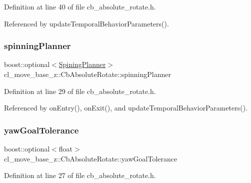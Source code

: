 Definition at line 40 of file cb\+\_\+absolute\+\_\+rotate.\+h.



Referenced by update\+Temporal\+Behavior\+Parameters().

\mbox{\label{classcl__move__base__z_1_1CbAbsoluteRotate_a17d836524599af072cf2e3488e491a91}} 
\subsubsection{\texorpdfstring{spinning\+Planner}{spinningPlanner}}
{\footnotesize\ttfamily boost\+::optional$<$\hyperlink{namespacecl__move__base__z_aab2ad3041275145f0065fb60b3299345}{Spining\+Planner}$>$ cl\+\_\+move\+\_\+base\+\_\+z\+::\+Cb\+Absolute\+Rotate\+::spinning\+Planner}



Definition at line 29 of file cb\+\_\+absolute\+\_\+rotate.\+h.



Referenced by on\+Entry(), on\+Exit(), and update\+Temporal\+Behavior\+Parameters().

\mbox{\label{classcl__move__base__z_1_1CbAbsoluteRotate_a8d8b5b9c2c821efe101bb07c96c4bdd3}} 
\subsubsection{\texorpdfstring{yaw\+Goal\+Tolerance}{yawGoalTolerance}}
{\footnotesize\ttfamily boost\+::optional$<$float$>$ cl\+\_\+move\+\_\+base\+\_\+z\+::\+Cb\+Absolute\+Rotate\+::yaw\+Goal\+Tolerance}



Definition at line 27 of file cb\+\_\+absolute\+\_\+rotate.\+h.



